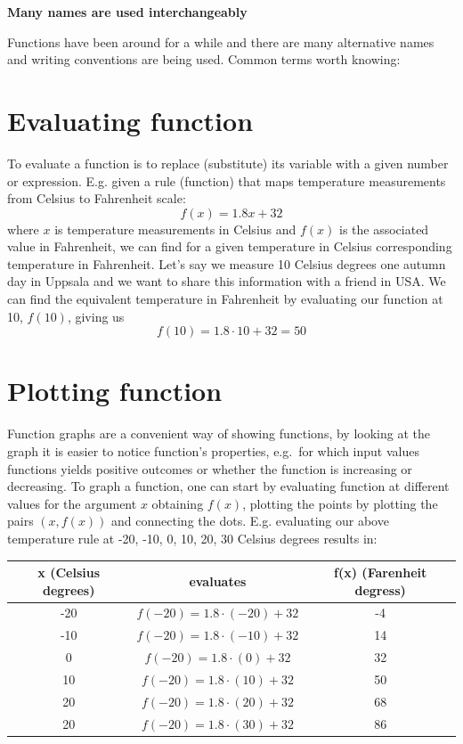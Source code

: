 \documentclass[
]{book}
\theoremstyle{definition}
\theoremstyle{definition}
\theoremstyle{definition}
\theoremstyle{remark}
\begin{document}
\textbf{Many names are used interchangeably}

Functions have been around for a while and there are many alternative names and writing conventions are being used. Common terms worth knowing:

\hypertarget{evaluating-function}{%
\section{Evaluating function}\label{evaluating-function}}

To evaluate a function is to replace (substitute) its variable with a given number or expression. E.g. given a rule (function) that maps temperature measurements from Celsius to Fahrenheit scale:
\[f(x) = 1.8x + 32\]
where \(x\) is temperature measurements in Celsius and \(f(x)\) is the associated value in Fahrenheit, we can find for a given temperature in Celsius corresponding temperature in Fahrenheit. Let's say we measure 10 Celsius degrees one autumn day in Uppsala and we want to share this information with a friend in USA. We can find the equivalent temperature in Fahrenheit by evaluating our function at 10, \(f(10)\), giving us \[f(10) = 1.8\cdot 10 + 32 = 50\]

\hypertarget{plotting-function}{%
\section{Plotting function}\label{plotting-function}}

Function graphs are a convenient way of showing functions, by looking at the graph it is easier to notice function's properties, e.g.~for which input values functions yields positive outcomes or whether the function is increasing or decreasing. To graph a function, one can start by evaluating function at different values for the argument \(x\) obtaining \(f(x)\), plotting the points by plotting the pairs \((x, f(x))\) and connecting the dots. E.g. evaluating our above temperature rule at -20, -10, 0, 10, 20, 30 Celsius degrees results in:

\begin{longtable}[]{@{}ccc@{}}
\toprule
x (Celsius degrees) & evaluates & f(x) (Farenheit degress)\tabularnewline
\midrule
\endhead
-20 & \(f(-20) = 1.8 \cdot (-20) + 32\) & -4\tabularnewline
-10 & \(f(-20) = 1.8 \cdot (-10) + 32\) & 14\tabularnewline
0 & \(f(-20) = 1.8 \cdot (0) + 32\) & 32\tabularnewline
10 & \(f(-20) = 1.8 \cdot (10) + 32\) & 50\tabularnewline
20 & \(f(-20) = 1.8 \cdot (20) + 32\) & 68\tabularnewline
20 & \(f(-20) = 1.8 \cdot (30) + 32\) & 86\tabularnewline
\bottomrule
\end{longtable}
\end{document}
